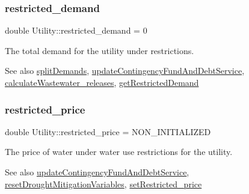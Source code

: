 \subsubsection{\texorpdfstring{restricted\+\_\+demand}{restricted\_demand}}
{\footnotesize\ttfamily double Utility\+::restricted\+\_\+demand = 0\hspace{0.3cm}{\ttfamily [private]}}



The total demand for the utility under restrictions. 

\begin{DoxySeeAlso}{See also}
\mbox{\hyperlink{classUtility_aca42b14087c3184d4fec10a2e8729c05}{split\+Demands}}, \mbox{\hyperlink{classUtility_ab663efd526505a3d843cae7075cc3b91}{update\+Contingency\+Fund\+And\+Debt\+Service}}, \mbox{\hyperlink{classUtility_a5feecc73d561de022eb6ba3c657b3dbc}{calculate\+Wastewater\+\_\+releases}}, \mbox{\hyperlink{classUtility_ade3427a88355631a3657f752ace874fc}{get\+Restricted\+Demand}} 
\end{DoxySeeAlso}
\mbox{\label{classUtility_ad8c81bed9c3f3978a669f1259845b228}} 
\subsubsection{\texorpdfstring{restricted\+\_\+price}{restricted\_price}}
{\footnotesize\ttfamily double Utility\+::restricted\+\_\+price = N\+O\+N\+\_\+\+I\+N\+I\+T\+I\+A\+L\+I\+Z\+ED\hspace{0.3cm}{\ttfamily [private]}}



The price of water under water use restrictions for the utility. 

\begin{DoxySeeAlso}{See also}
\mbox{\hyperlink{classUtility_ab663efd526505a3d843cae7075cc3b91}{update\+Contingency\+Fund\+And\+Debt\+Service}}, \mbox{\hyperlink{classUtility_af9ec9c2cb69166db021f03ce9ddf4d8e}{reset\+Drought\+Mitigation\+Variables}}, \mbox{\hyperlink{classUtility_a7f642d886a6d1d165e86b2e6a7c51ed4}{set\+Restricted\+\_\+price}} 
\end{DoxySeeAlso}
\mbox{\label{classUtility_a13be6c9b210e5f080785b7e2e0c35566}} 
